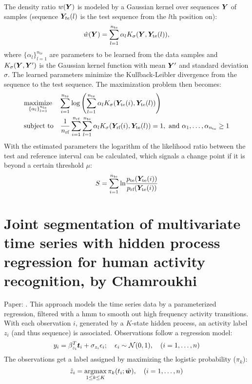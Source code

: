 The density ratio $w(\matrixsym{Y})$ is modeled by a Gaussian kernel over sequences $\matrixsym{Y}$ of samples (sequence $\matrixsym{Y}_{te}(l)$ is the test sequence from the $l$th position on):
%
\begin{equation}
  \hat{w}(\matrixsym{Y}) = \sum_{l=1}^{n_\text{te}} \alpha_l K_\sigma(\matrixsym{Y}, \matrixsym{Y}_\text{te}(l)),
\end{equation}
%
where $\{\alpha_l\}_{l=1}^{n_\text{te}}$ are parameters to be learned from the data samples and $K_\sigma(\matrixsym{Y}, \matrixsym{Y}')$ is the Gaussian kernel function with mean $\matrixsym{Y}'$ and standard deviation $\sigma$.
The learned parameters minimize the Kullback-Leibler divergence from the sequence to the test sequence.
The maximization problem then becomes:
%
\begin{equation}
  \maximize{\{\alpha_l\}_{l=1}^{n_\text{te}}}
    {\sum_{i=1}^{n_\text{te}} \text{log} \left(\sum_{l=1}^{n_\text{te}} \alpha_l K_\sigma(\matrixsym{Y}_\text{te}(i), \matrixsym{Y}_\text{te}(l) ) \right)}
    {\frac{1}{n_\text{rf}} \sum_{i=1}^{n_\text{rf}} \sum_{l=1}^{n_\text{te}} \alpha_l K_\sigma(\matrixsym{Y}_\text{rf}(i), \matrixsym{Y}_\text{te}(l)) = 1, ~ \text{and} ~ \alpha_1, \dots ,\alpha_{n_\text{te}} \geq 1}
\end{equation}
%
With the estimated parameters the logarithm of the likelihood ratio between the test and reference interval can be calculated, which signals a change point if it is beyond a certain threshold $\mu$:
%
\begin{equation}
  S = \sum_{i=1}^{n_\text{te}} \text{ln}
    \frac
    {p_\text{te}(\matrixsym{Y}_\text{te}(i))}
    {p_\text{rf}(\matrixsym{Y}_\text{te}(i))}
\end{equation}


\section{Joint segmentation of multivariate time series with hidden process regression for human activity recognition, by Chamroukhi}
Paper: \cite{chamroukhi2013joint}.
This approach models the time series data by a parameterized regression, filtered with a \gls{hmm} to smooth out high frequency activity transitions.
With each observation $i$, generated by a $K$-state hidden process, an activity label $z_i$ (and thus sequence) is associated.
Observations follow a regression model:
%
\begin{equation}
  y_i = \beta_{z_i}^T \vectorsym{t}_i + \sigma_{z_i} \epsilon_i; \quad \epsilon_i \sim \mathcal{N}(0,1), \quad (i=1, \dots ,n)
\end{equation}
%
The observations get a label assigned by maximizing the logistic probability ($\pi_k$):
%
\begin{equation}
  \hat{z}_i = \argmaxold \limits_{1 \leq k \leq K} \pi_k (t_i; \hat{\vectorsym{w}}), \quad (i=1, \dots, n)
\end{equation}
%